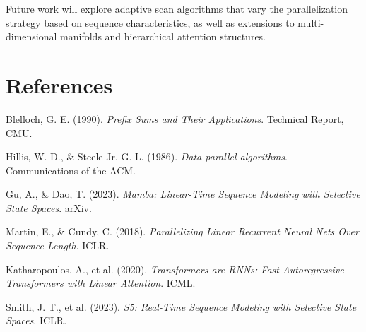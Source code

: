 \documentclass[12pt,a4paper]{article}
\begin{document}
Future work will explore adaptive scan algorithms that vary the parallelization strategy based on sequence characteristics, as well as extensions to multi-dimensional manifolds and hierarchical attention structures.

\vfill

\section*{References}

\begin{enumerate}[leftmargin=1.5cm, label={[\arabic*]}]
\item Blelloch, G. E. (1990). \textit{Prefix Sums and Their Applications}. Technical Report, CMU.

\item Hillis, W. D., \& Steele Jr, G. L. (1986). \textit{Data parallel algorithms}. Communications of the ACM.

\item Gu, A., \& Dao, T. (2023). \textit{Mamba: Linear-Time Sequence Modeling with Selective State Spaces}. arXiv.

\item Martin, E., \& Cundy, C. (2018). \textit{Parallelizing Linear Recurrent Neural Nets Over Sequence Length}. ICLR.

\item Katharopoulos, A., et al. (2020). \textit{Transformers are RNNs: Fast Autoregressive Transformers with Linear Attention}. ICML.

\item Smith, J. T., et al. (2023). \textit{S5: Real-Time Sequence Modeling with Selective State Spaces}. ICLR.
\end{enumerate}
\end{document}
